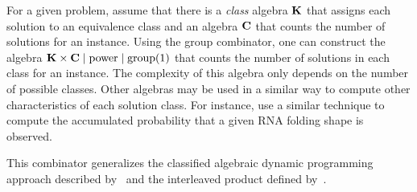 \begin{example}\label{ex:classified-algebra}
    For a given problem, assume that there is a \emph{class} algebra \(\mathbf{K}\) that assigns each solution to an equivalence class and an algebra \(\mathbf{C}\) that counts the number of solutions for an instance.
    Using the group combinator, one can construct the algebra \(\mathbf{K} \times \mathbf{C} \mid \mathrm{power} \mid \mathrm{group}(1)\) that counts the number of solutions in each class for an instance.
    The complexity of this algebra only depends on the number of possible classes.
    Other algebras may be used in a similar way to compute other characteristics of each solution class.
    For instance, \textcite{Vos2006CompleteProbabilisticAnalysis} use a similar technique to compute the accumulated probability that a given RNA folding shape is observed.
\end{example}

This combinator generalizes the classified algebraic dynamic programming approach described by~\textcite{Vos2006CompleteProbabilisticAnalysis} and the interleaved product defined by~\textcite{Sauthoff2013BellmansGapLanguage}.

